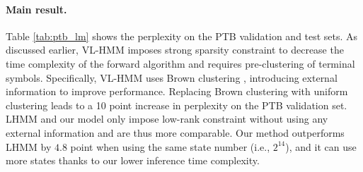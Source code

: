 \documentclass[11pt]{article}
\begin{document}
\paragraph{Main result.}
Table \ref{tab:ptb_lm} shows the perplexity on the PTB validation and test sets. As discussed earlier, VL-HMM \cite{chiu-rush-2020-scaling} imposes strong sparsity constraint to decrease the time complexity of the forward algorithm and requires pre-clustering of terminal symbols. Specifically, VL-HMM uses Brown clustering \cite{brown-etal-1992-class}, introducing external information to improve performance. Replacing Brown clustering with uniform clustering leads to a 10 point increase in perplexity on the PTB validation set. LHMM \cite{chiu2021low} and our model only impose low-rank constraint without using any external information and are thus more comparable. Our method outperforms LHMM by $4.8$ point when using the same state number (i.e., $2^{14}$), and it can use more states thanks to our lower inference time complexity.

\begin{table}[tb!]
    \centering 
    \caption{Resulting perplexity on PTB validate set and test set. VL-HMM: \cite{chiu-rush-2020-scaling}. LHMM: \cite{chiu2021low}.
    $\dagger$ denotes results reported by ablation study of \citet{chiu-rush-2020-scaling}.}
    \label{tab:ptb_lm}
\end{table}
\end{document}
